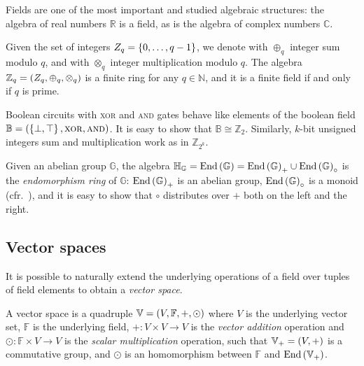 Fields are one of the most important and studied algebraic structures: the algebra of real numbers 
\(\mathbb{R}\) is a field, as is the algebra of complex numbers \(\mathbb{C}\).
\begin{remark}
  Given the set of integers \(Z_q = \left\{0, \dots, q-1\right\}\), we denote with \(\oplus_q\) 
  integer sum modulo \(q\), and with \(\otimes_q\) integer multiplication modulo \(q\).
  The algebra \(\mathbb{Z}_q = \left(Z_q, \oplus_q, \otimes_q\right)\) is a finite ring for any 
  \(q \in \mathbb{N}\), and it is a finite field if and only if \(q\) is prime.
\end{remark}

\begin{example}
  Boolean circuits with \textsc{xor} and \textsc{and} gates behave like elements of the boolean 
  field \(\mathbb{B} = \left(\left\{\bot, \top\right\}, \mathbin{\textnormal{\textsc{xor}}}, \mathbin{\textnormal{\textsc{and}}}\right) \).
  It is easy to show that \(\mathbb{B} \cong \mathbb{Z}_2\).
  Similarly, \(k\)-bit unsigned integers sum and multiplication work as in \(\mathbb{Z}_{2^k}\).
\end{example}

\begin{example}
  Given an abelian group \(\mathbb{G}\), the algebra \(\mathbb{H}_{\mathbb{G}} = 
  \mathrm{End}\left(\mathbb{G}\right) = \mathrm{End}\left(\mathbb{G}\right)_{+} \cup \mathrm{End}\left(\mathbb{G}\right)_{\circ}\) 
  is the \emph{endomorphism ring} of \(\mathbb{G}\): \(\mathrm{End}\left(\mathbb{G}\right)_{+}\) is an abelian 
  group, \(\mathrm{End}\left(\mathbb{G}\right)_{\circ}\) is a monoid 
  (cfr.\ ), and it is easy to show that \(\circ \)
  distributes over \(+\) both on the left and the right.
\end{example}

\subsection{Vector spaces}
It is possible to naturally extend the underlying operations of a field over tuples of field 
elements to obtain a \emph{vector space}.
\begin{definition}
  A vector space is a quadruple \(\mathbb{V} = \left(V, \mathbb{F}, +, \odot\right)\) where 
  \(V\) is the underlying vector set, \(\mathbb{F}\) is the underlying field, 
  \(+\colon V \times V \to V\) is the \emph{vector addition} operation and 
  \(\odot\colon \mathbb{F} \times V \to V\) is the \emph{scalar multiplication} operation, such 
  that \(\mathbb{V}_{+} = \left(V, +\right)\) is a commutative group, and \(\odot \) is an 
  homomorphism between \(\mathbb{F}\) and \(\mathrm{End}\left(\mathbb{V}_{+}\right)\).
\end{definition} 
